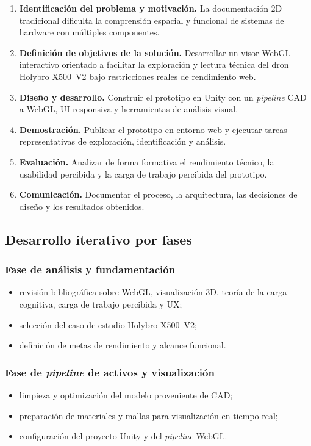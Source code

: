 \begin{enumerate}
    \item \textbf{Identificaci\'on del problema y motivaci\'on.} La documentaci\'on 2D tradicional dificulta la comprensi\'on espacial y funcional de sistemas de hardware con m\'ultiples componentes.
    \item \textbf{Definici\'on de objetivos de la soluci\'on.} Desarrollar un visor WebGL interactivo orientado a facilitar la exploraci\'on y lectura t\'ecnica del dron Holybro X500~V2 bajo restricciones reales de rendimiento web.
    \item \textbf{Dise\~no y desarrollo.} Construir el prototipo en Unity con un \textit{pipeline} CAD a WebGL, UI responsiva y herramientas de an\'alisis visual.
    \item \textbf{Demostraci\'on.} Publicar el prototipo en entorno web y ejecutar tareas representativas de exploraci\'on, identificaci\'on y an\'alisis.
    \item \textbf{Evaluaci\'on.} Analizar de forma formativa el rendimiento t\'ecnico, la usabilidad percibida y la carga de trabajo percibida del prototipo.
    \item \textbf{Comunicaci\'on.} Documentar el proceso, la arquitectura, las decisiones de dise\~no y los resultados obtenidos.
\end{enumerate}

\subsection{Desarrollo iterativo por fases}

\subsubsection{Fase de an\'alisis y fundamentaci\'on}
\begin{itemize}
    \item revisi\'on bibliogr\'afica sobre WebGL, visualizaci\'on 3D, teor\'ia de la carga cognitiva, carga de trabajo percibida y UX;
    \item selecci\'on del caso de estudio Holybro X500~V2;
    \item definici\'on de metas de rendimiento y alcance funcional.
\end{itemize}

\subsubsection{Fase de \textit{pipeline} de activos y visualizaci\'on}
\begin{itemize}
    \item limpieza y optimizaci\'on del modelo proveniente de CAD;
    \item preparaci\'on de materiales y mallas para visualizaci\'on en tiempo real;
    \item configuraci\'on del proyecto Unity y del \textit{pipeline} WebGL.
\end{itemize}

